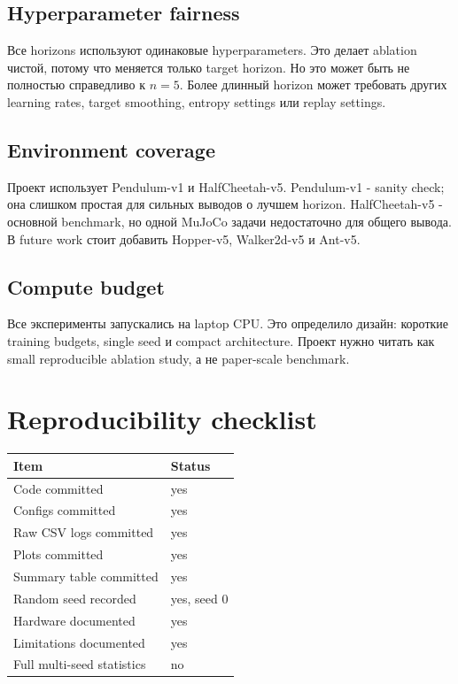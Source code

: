 \documentclass[
  russian,
]{article}
\begin{document}
\subsection{Hyperparameter fairness}\label{hyperparameter-fairness}

Все horizons используют одинаковые hyperparameters. Это делает ablation
чистой, потому что меняется только target horizon. Но это может быть не
полностью справедливо к \(n=5\). Более длинный horizon может требовать
других learning rates, target smoothing, entropy settings или replay
settings.

\subsection{Environment coverage}\label{environment-coverage}

Проект использует Pendulum-v1 и HalfCheetah-v5. Pendulum-v1 - sanity
check; она слишком простая для сильных выводов о лучшем horizon.
HalfCheetah-v5 - основной benchmark, но одной MuJoCo задачи недостаточно
для общего вывода. В future work стоит добавить Hopper-v5, Walker2d-v5 и
Ant-v5.

\subsection{Compute budget}\label{compute-budget}

Все эксперименты запускались на laptop CPU. Это определило дизайн:
короткие training budgets, single seed и compact architecture. Проект
нужно читать как small reproducible ablation study, а не paper-scale
benchmark.

\section{Reproducibility checklist}\label{reproducibility-checklist}

\begin{longtable}[]{@{}ll@{}}
\toprule\noalign{}
Item & Status \\
\midrule\noalign{}
\endhead
\bottomrule\noalign{}
\endlastfoot
Code committed & yes \\
Configs committed & yes \\
Raw CSV logs committed & yes \\
Plots committed & yes \\
Summary table committed & yes \\
Random seed recorded & yes, seed 0 \\
Hardware documented & yes \\
Limitations documented & yes \\
Full multi-seed statistics & no \\
\end{longtable}
\end{document}
